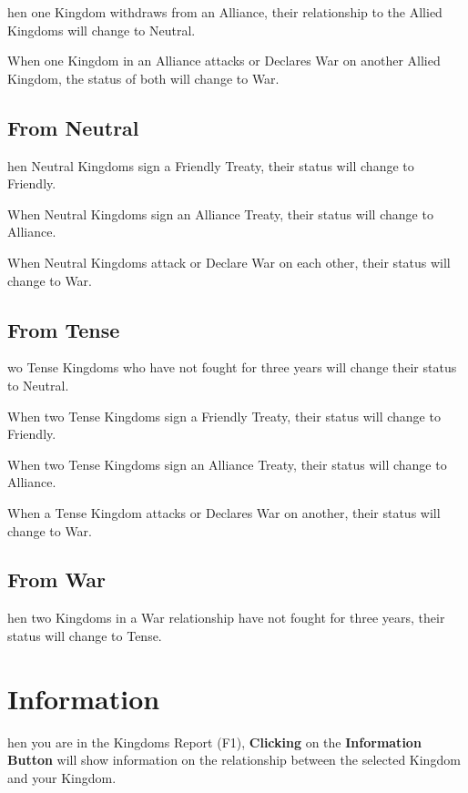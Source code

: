 hen one Kingdom withdraws from an Alliance, their relationship to the Allied Kingdoms will change to Neutral.

When one Kingdom in an Alliance attacks or Declares War on another Allied Kingdom, the status of both will change to War.

\subsection{From Neutral}

hen Neutral Kingdoms sign a Friendly Treaty, their status will change to Friendly.

When Neutral Kingdoms sign an Alliance Treaty, their status will change to Alliance.

When Neutral Kingdoms attack or Declare War on each other, their status will change to War.

\subsection{From Tense}

wo Tense Kingdoms who have not fought for three years will change their status to Neutral.

When two Tense Kingdoms sign a Friendly Treaty, their status will change to Friendly.

When two Tense Kingdoms sign an Alliance Treaty, their status will change to Alliance.

When a Tense Kingdom attacks or Declares War on another, their status will change to War.

\subsection{From War}


hen two Kingdoms in a War relationship have not fought for three years, their status will change to Tense.

\section{{Information}}

hen you are in the Kingdoms Report (F1), \textbf{Clicking} on the \textbf{Information Button} will show information on the relationship between the selected Kingdom and your Kingdom.

